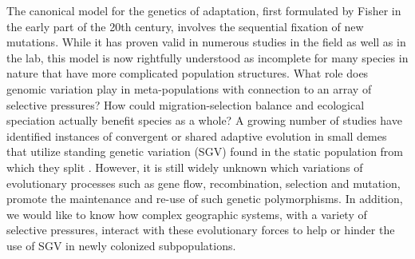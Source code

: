 \documentclass{article}
\newcommand{\plr}[1]{\todo[linecolor=blue,backgroundcolor=blue!25,bordercolor=blue]{#1}}
\begin{document}
The canonical model for the genetics of adaptation, first formulated by Fisher in the early part of the 20th century, involves the sequential fixation of new mutations. 
While it has proven valid in numerous studies in the field as well as in the lab, this model is now rightfully understood as incomplete for many species in nature that have more complicated population structures. 
What role does genomic variation play in meta-populations with connection to an array of selective pressures?
How could migration-selection balance and ecological speciation actually benefit species as a whole?
A growing number of studies have identified instances of convergent or shared adaptive evolution in small demes that utilize standing genetic variation (SGV) found in the static population from which they split \citet{nelson2017ancient,Schrider2017,Barrett2008}.
However, it is still widely unknown which variations of evolutionary processes such as gene flow, recombination, selection and mutation, promote the maintenance and re-use of such genetic polymorphisms.
In addition, we would like to know how complex geographic systems, with a variety of selective pressures, interact with these evolutionary forces to help or hinder the use of SGV in newly colonized subpopulations.
\end{document}
